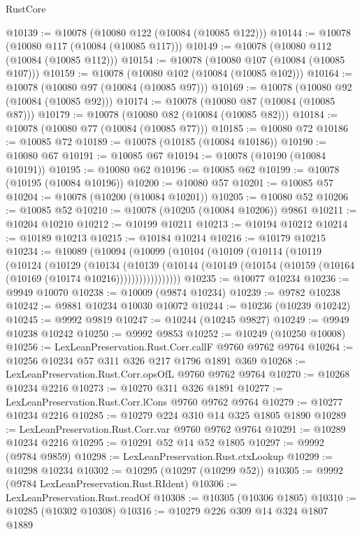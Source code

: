 \begin{lexlean}{RustCore}
\begin{coremodule}
@10139 := @10078 (@10080 @122 (@10084 (@10085 @122)))
@10144 := @10078 (@10080 @117 (@10084 (@10085 @117)))
@10149 := @10078 (@10080 @112 (@10084 (@10085 @112)))
@10154 := @10078 (@10080 @107 (@10084 (@10085 @107)))
@10159 := @10078 (@10080 @102 (@10084 (@10085 @102)))
@10164 := @10078 (@10080 @97 (@10084 (@10085 @97)))
@10169 := @10078 (@10080 @92 (@10084 (@10085 @92)))
@10174 := @10078 (@10080 @87 (@10084 (@10085 @87)))
@10179 := @10078 (@10080 @82 (@10084 (@10085 @82)))
@10184 := @10078 (@10080 @77 (@10084 (@10085 @77)))
@10185 := @10080 @72
@10186 := @10085 @72
@10189 := @10078 (@10185 (@10084 @10186))
@10190 := @10080 @67
@10191 := @10085 @67
@10194 := @10078 (@10190 (@10084 @10191))
@10195 := @10080 @62
@10196 := @10085 @62
@10199 := @10078 (@10195 (@10084 @10196))
@10200 := @10080 @57
@10201 := @10085 @57
@10204 := @10078 (@10200 (@10084 @10201))
@10205 := @10080 @52
@10206 := @10085 @52
@10210 := @10078 (@10205 (@10084 @10206)) @9861
@10211 := @10204 @10210
@10212 := @10199 @10211
@10213 := @10194 @10212
@10214 := @10189 @10213
@10215 := @10184 @10214
@10216 := @10179 @10215
@10234 := @10089
    (@10094
      (@10099
        (@10104
          (@10109
            (@10114
              (@10119
                (@10124
                  (@10129
                    (@10134
                      (@10139
                        (@10144
                          (@10149 (@10154 (@10159 (@10164 (@10169 (@10174 @10216)))))))))))))))))
@10235 := @10077 @10234
@10236 := @9949 @10070
@10238 := @10009 (@9874 @10234)
@10239 := @9782 @10238
@10242 := @9881 @10234 @10030 @10072
@10244 := @10236 (@10239 @10242)
@10245 := @9992 @9819
@10247 := @10244 (@10245 @9827)
@10249 := @9949 @10238 @10242
@10250 := @9992 @9853
@10252 := @10249 (@10250 @10008)
@10256 := LexLeanPreservation.Rust.Corr.callF @9760 @9762 @9764
@10264 := @10256 @10234 @57 @311 @326 @217 @1796 @1891 @369
@10268 := LexLeanPreservation.Rust.Corr.opsOfL @9760 @9762 @9764
@10270 := @10268 @10234 @2216
@10273 := @10270 @311 @326 @1891
@10277 := LexLeanPreservation.Rust.Corr.lCons @9760 @9762 @9764
@10279 := @10277 @10234 @2216
@10285 := @10279 @224 @310 @14 @325 @1805 @1890
@10289 := LexLeanPreservation.Rust.Corr.var @9760 @9762 @9764
@10291 := @10289 @10234 @2216
@10295 := @10291 @52 @14 @52 @1805
@10297 := @9992 (@9784 @9859)
@10298 := LexLeanPreservation.Rust.ctxLookup
@10299 := @10298 @10234
@10302 := @10295 (@10297 (@10299 @52))
@10305 := @9992 (@9784 LexLeanPreservation.Rust.RIdent)
@10306 := LexLeanPreservation.Rust.readOf
@10308 := @10305 (@10306 @1805)
@10310 := @10285 (@10302 @10308)
@10316 := @10279 @226 @309 @14 @324 @1807 @1889

\end{coremodule}
\end{lexlean}
